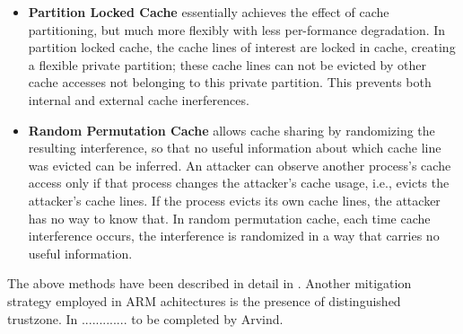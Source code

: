 \documentclass[twocolumn]{IEEEtran}
\begin{document}
\begin{itemize}
\item \textbf {Partition Locked Cache} essentially achieves the effect of cache partitioning, but much more flexibly with less per-formance degradation. In partition locked cache, the cache lines of interest are locked in cache, creating a flexible private partition; these cache lines can not be evicted by other cache accesses not belonging to this private partition. This prevents both internal and external cache inerferences.

\item \textbf {Random Permutation Cache} allows cache sharing by randomizing the resulting interference, so that no useful information about which cache line was evicted can be inferred. An attacker can observe another process’s cache access only if that process changes the attacker’s cache usage, i.e., evicts the attacker’s cache lines. If the process evicts its own cache lines, the attacker has no way to know that.  In random permutation cache, each time cache interference occurs, the interference is randomized in a way that carries no useful information. 

\end{itemize}

The above methods have been described in detail in \cite{wang2007new}. Another mitigation strategy employed in ARM achitectures is the presence of distinguished trustzone. In ............. to be completed by Arvind.








\end{document}
